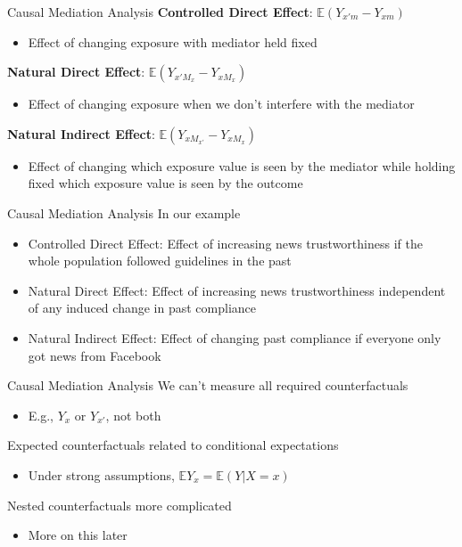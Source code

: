 \documentclass[14pt]{beamer}
\newcommand{\CMA}{Causal Mediation Analysis}
\newcommand{\bE}{\mathbb{E}}
\begin{document}
\begin{frame}{Causal Mediation Analysis}
    \textbf{Controlled Direct Effect}: $\mathbb{E}(Y_{x'm} - Y_{xm})$
    \begin{itemize}
        \item Effect of changing exposure with mediator held fixed \newline
    \end{itemize}

    \textbf{Natural Direct Effect}: $\mathbb{E}(Y_{x'M_{x}} - Y_{xM_{x}})$
    \begin{itemize}
        \item Effect of changing exposure when we don't interfere with the mediator  \newline
    \end{itemize}

    \textbf{Natural Indirect Effect}: $\mathbb{E}(Y_{xM_{x'}} - Y_{xM_{x}})$
    \begin{itemize}
        \item Effect of changing which exposure value is seen by the mediator while holding fixed which exposure value is seen by the outcome
    \end{itemize}
\end{frame}

\begin{frame}{\CMA}
    In our example
    \begin{itemize}
        \item Controlled Direct Effect: Effect of increasing news trustworthiness if the whole population followed guidelines in the past
        \item Natural Direct Effect: Effect of increasing news trustworthiness independent of any induced change in past compliance
        \item Natural Indirect Effect: Effect of changing past compliance if everyone only got news from Facebook
    \end{itemize}
\end{frame}

\begin{frame}{\CMA}
    We can't measure all required counterfactuals
    \begin{itemize}
        \item E.g., $Y_x$ or $Y_{x'}$, not both \newline
    \end{itemize}

    Expected counterfactuals related to conditional expectations

    \begin{itemize}
        \item     Under strong assumptions, $\bE Y_x = \bE(Y | X=x)$ \newline
    \end{itemize}

    Nested counterfactuals more complicated
    \begin{itemize}
        \item More on this later
    \end{itemize}
\end{frame}
\end{document}
